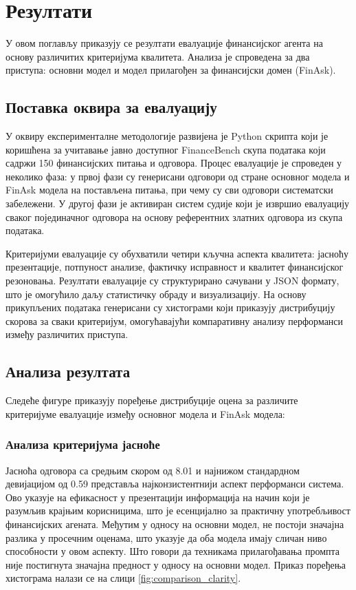 \chapter{Резултати}
\label{sec:rezultati}

У овом поглављу приказују се резултати евалуације финансијског агента на основу различитих критеријума квалитета. Анализа је спроведена за два приступа: основни модел и модел прилагођен за финансијски домен (FinAsk).

\section{Поставка оквира за евалуацију}

У оквиру експерименталне методологије развијена је Python скрипта који је коришћена за учитавање јавно доступног FinanceBench скупа података који садржи 150 финансијских питања и одговора. Процес евалуације је спроведен у неколико фаза: у првој фази су генерисани одговори од стране основног модела и FinAsk модела на постављена питања, при чему су сви одговори систематски забележени. У другој фази је активиран систем судије који је извршио евалуацију сваког појединачног одговора на основу референтних златних одговора из скупа података.

Критеријуми евалуације су обухватили четири кључна аспекта квалитета: јасноћу презентације, потпуност анализе, фактичку исправност и квалитет финансијског резоновања. Резултати евалуације су структурирано сачувани у JSON формату, што је омогућило даљу статистичку обраду и визуализацију. На основу прикупљених података генерисани су хистограми који приказују дистрибуцију скорова за сваки критеријум, омогућавајући компаративну анализу перформанси између различитих приступа.

\section{Анализа резултата}
Следеће фигуре приказују поређење дистрибуције оцена за различите критеријуме евалуације између основног модела и FinAsk модела:

\subsection{Анализа критеријума јасноће}

Јасноћа одговора са средњим скором од 8.01 и најнижом стандардном девијацијом од 0.59 представља најконзистентнији аспект перформанси система. Ово указује на ефикасност у презентацији информација на начин који је разумљив крајњим корисницима, што је есенцијално за практичну употребљивост финансијских агената. Међутим у односу на основни модел, не постоји значајна разлика у просечним оценама, што указује да оба модела имају сличан ниво способности у овом аспекту. Што говори да техникама прилагођавања промпта није постигнута значајна предност у односу на основни модел. Приказ поређења хистограма налази се на слици \ref{fig:comparison_clarity}.


